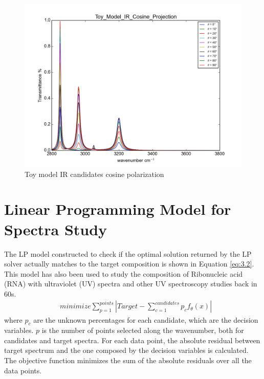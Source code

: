 \begin{figure}[!ht] \label{fig:3.1}
\centering
\includegraphics[scale=0.4]{Figures/Toy_Model_IR_Cosine_Projection.png} 
\caption{Toy model IR candidates cosine polarization} 
\end{figure}


\section{Linear Programming Model for Spectra Study}

The LP model constructed to check if the optimal solution returned by the LP solver actually matches to the target composition is shown in Equation \ref{eq:3.2}. This model has also been used to study the composition of Ribonucleic acid (RNA) with ultraviolet (UV) spectra \cite{NYAS:NYAS900} and other UV spectroscopy studies  \cite{LPATUAS} back in 60s. \\

\begin{eqnarray} \label{eq:3.2}
& minimize \displaystyle\sum^{points}_{p=1} \left| Target- \displaystyle\sum^{candidates}_{c=1}p_{c}f_{\theta}(x) \right| 
\end{eqnarray}
where $p_{c}$ are the unknown percentages for each candidate, which are the decision variables. $p$ is the number of points selected along the wavenumber, both for candidates and target spectra. For each data point, the absolute residual between target spectrum and the one composed by the decision variables is calculated. The objective function minimizes the sum of the absolute residuals over all the data points. \\

